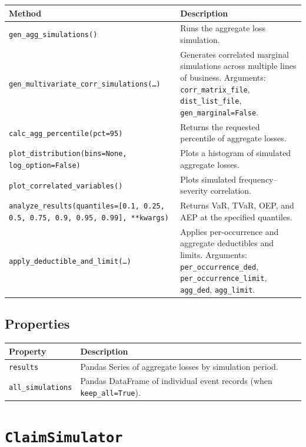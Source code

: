 \begin{longtable}{p{}p{}}
\toprule
\textbf{Method} & \textbf{Description} \\
\midrule
\endhead
\texttt{gen\_agg\_simulations()} &
    Runs the aggregate loss simulation. \\
\texttt{gen\_multivariate\_corr\_simulations(\dots)} &
    Generates correlated marginal simulations across multiple lines of
    business. Arguments: \texttt{corr\_matrix\_file},
    \texttt{dist\_list\_file}, \texttt{gen\_marginal=False}. \\
\texttt{calc\_agg\_percentile(pct=95)} &
    Returns the requested percentile of aggregate losses. \\
\texttt{plot\_distribution(bins=None, log\_option=False)} &
    Plots a histogram of simulated aggregate losses. \\
\texttt{plot\_correlated\_variables()} &
    Plots simulated frequency--severity correlation. \\
\texttt{analyze\_results(quantiles=[0.1, 0.25, 0.5, 0.75, 0.9, 0.95, 0.99], **kwargs)} &
    Returns VaR, TVaR, OEP, and AEP at the specified quantiles. \\
\texttt{apply\_deductible\_and\_limit(\dots)} &
    Applies per-occurrence and aggregate deductibles and limits.
    Arguments: \texttt{per\_occurrence\_ded},
    \texttt{per\_occurrence\_limit}, \texttt{agg\_ded},
    \texttt{agg\_limit}. \\
\bottomrule
\end{longtable}

\subsection*{Properties}

\begin{longtable}{p{}p{}}
\toprule
\textbf{Property} & \textbf{Description} \\
\midrule
\endhead
\texttt{results} &
    Pandas Series of aggregate losses by simulation period. \\
\texttt{all\_simulations} &
    Pandas DataFrame of individual event records (when
    \texttt{keep\_all=True}). \\
\bottomrule
\end{longtable}

\section{\texttt{ClaimSimulator}}
\label{api:claim_simulator}

